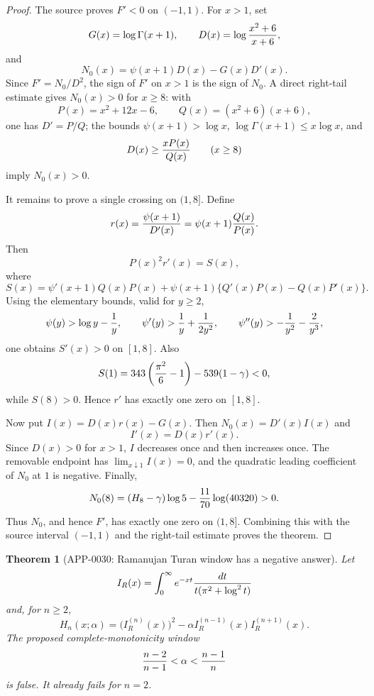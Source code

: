 \documentclass[11pt]{article}
\numberwithin{equation}{section}
\newtheorem{theorem}{Theorem}[section]
\theoremstyle{definition}
\theoremstyle{remark}
\newcommand{\1}{\mathbf 1}
\begin{document}
\begin{proof}
The source proves \(F'<0\) on \((-1,1)\).  For \(x>1\), set
\[
 G(x)=\log\Gamma(x+1),\qquad
 D(x)=\log{x^2+6\over x+6},
\]
and
\[
 N_0(x)=\psi(x+1)D(x)-G(x)D'(x).
\]
Since \(F'=N_0/D^2\), the sign of \(F'\) on \(x>1\) is the sign of \(N_0\).
A direct right-tail estimate gives \(N_0(x)>0\) for \(x\ge8\): with
\[
 P(x)=x^2+12x-6,\qquad Q(x)=(x^2+6)(x+6),
\]
one has \(D'=P/Q\); the bounds \(\psi(x+1)>\log x\),
\(\log\Gamma(x+1)\le x\log x\), and
\[
 D(x)\ge {xP(x)\over Q(x)}
 \qquad(x\ge8)
\]
imply \(N_0(x)>0\).

It remains to prove a single crossing on \((1,8]\).  Define
\[
 r(x)={\psi(x+1)\over D'(x)}
      =\psi(x+1){Q(x)\over P(x)}.
\]
Then
\[
 P(x)^2r'(x)=S(x),
\]
where
\[
 S(x)=\psi'(x+1)Q(x)P(x)
 +\psi(x+1)\{Q'(x)P(x)-Q(x)P'(x)\}.
\]
Using the elementary bounds, valid for \(y\ge2\),
\[
 \psi(y)>\log y-{1\over y},\qquad
 \psi'(y)>{1\over y}+{1\over2y^2},\qquad
 \psi''(y)>-{1\over y^2}-{2\over y^3},
\]
one obtains \(S'(x)>0\) on \([1,8]\).  Also
\[
 S(1)=343\left({\pi^2\over6}-1\right)-539(1-\gamma)<0,
\]
while \(S(8)>0\).  Hence \(r'\) has exactly one zero on \([1,8]\).

Now put \(I(x)=D(x)r(x)-G(x)\).  Then \(N_0(x)=D'(x)I(x)\) and
\[
 I'(x)=D(x)r'(x).
\]
Since \(D(x)>0\) for \(x>1\), \(I\) decreases once and then increases once.
The removable endpoint has \(\lim_{x\downarrow1}I(x)=0\), and the quadratic
leading coefficient of \(N_0\) at \(1\) is negative.  Finally,
\[
 N_0(8)=(H_8-\gamma)\log5-{11\over70}\log(40320)>0.
\]
Thus \(N_0\), and hence \(F'\), has exactly one zero on \((1,8]\).  Combining
this with the source interval \((-1,1)\) and the right-tail estimate proves
the theorem.
\end{proof}

\begin{theorem}[APP-0030: Ramanujan Turan window has a negative answer]
\label{thm:app30-ramanujan-turan}
Let
\[
 I_R(x)=\int_0^\infty e^{-xt}{dt\over t(\pi^2+\log^2t)}
\]
and, for \(n\ge2\),
\[
 H_n(x;\alpha)
 =
 \bigl(I_R^{(n)}(x)\bigr)^2
 -\alpha I_R^{(n-1)}(x)I_R^{(n+1)}(x).
\]
The proposed complete-monotonicity window
\[
 {n-2\over n-1}<\alpha<{n-1\over n}
\]
is false.  It already fails for \(n=2\).
\end{theorem}
\end{document}
